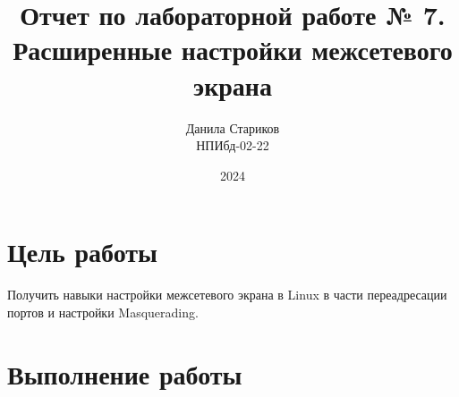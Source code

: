 

\title{Отчет по лабораторной работе № 7. \\ Расширенные настройки межсетевого экрана}
\author{Данила Стариков \\ НПИбд-02-22}
\date{2024}



\maketitle
\newpage

\tableofcontents

\newpage
\section{Цель работы}
Получить навыки настройки межсетевого экрана в Linux в части переадресации
портов и настройки Masquerading.
\newpage

\section{Выполнение работы}
